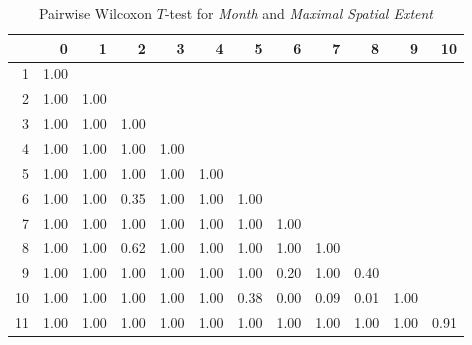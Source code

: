 \begin{table}[ht]
	\tiny
	\centering
	\begin{tabular}{rrrrrrrrrrrr}
		\toprule
		& 0 & 1 & 2 & 3 & 4 & 5 & 6 & 7 & 8 & 9 & 10 \\ 
		\midrule
		1 & 1.00 &  &  &  &  &  &  &  &  &  &  \\ 
		2 & 1.00 & 1.00 &  &  &  &  &  &  &  &  &  \\ 
		3 & 1.00 & 1.00 & 1.00 &  &  &  &  &  &  &  &  \\ 
		4 & 1.00 & 1.00 & 1.00 & 1.00 &  &  &  &  &  &  &  \\ 
		5 & 1.00 & 1.00 & 1.00 & 1.00 & 1.00 &  &  &  &  &  &  \\ 
		6 & 1.00 & 1.00 & 0.35 & 1.00 & 1.00 & 1.00 &  &  &  &  &  \\ 
		7 & 1.00 & 1.00 & 1.00 & 1.00 & 1.00 & 1.00 & 1.00 &  &  &  &  \\ 
		8 & 1.00 & 1.00 & 0.62 & 1.00 & 1.00 & 1.00 & 1.00 & 1.00 &  &  &  \\ 
		9 & 1.00 & 1.00 & 1.00 & 1.00 & 1.00 & 1.00 & 0.20 & 1.00 & 0.40 &  &  \\ 
		10 & 1.00 & 1.00 & 1.00 & 1.00 & 1.00 & 0.38 & 0.00 & 0.09 & 0.01 & 1.00 &  \\ 
		11 & 1.00 & 1.00 & 1.00 & 1.00 & 1.00 & 1.00 & 1.00 & 1.00 & 1.00 & 1.00 & 0.91 \\ 
		\bottomrule
	\end{tabular}
    \caption{Pairwise Wilcoxon $T$-test for \textit{Month} and \textit{Maximal Spatial Extent}}
    \label{tbl:wilcoxon_baysis_effector_AUrs1_Cov}
\end{table}
